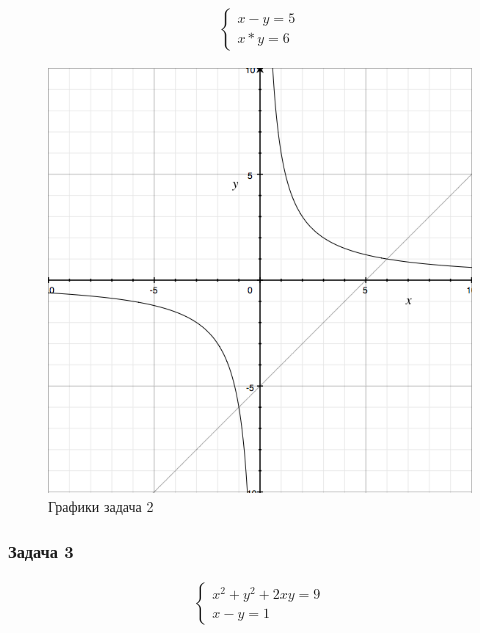 \documentclass[]{article}
\begin{document}
\begin{gather*}
\begin{cases}
x-y =5\\
x*y=6
\end{cases}
\end{gather*}

\begin{figure}[h]
\caption{Графики задача 2}
\centering
\includegraphics[width=\textwidth]{graph2}
\end{figure}

\subsubsection{Задача 3}

\begin{gather*}
\begin{cases}
x^2+y^2+2xy=9\\
x-y=1
\end{cases}
\end{gather*}
\end{document}
